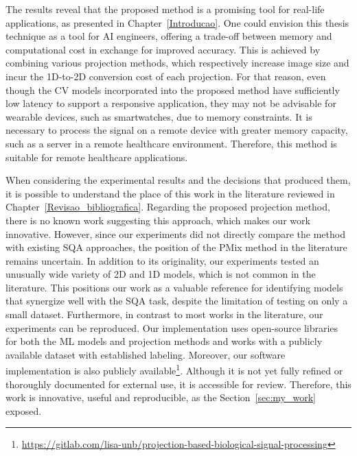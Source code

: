 The results reveal that the proposed method is a promising tool for real-life applications, as presented in Chapter~\ref{Introducao}.
One could envision this thesis technique as a tool for \gls{AI} engineers, offering a trade-off between memory and computational cost in exchange for improved accuracy. This is achieved by combining various projection methods, which respectively increase image size and incur the 1D-to-2D conversion cost of each projection.
For that reason, even though the \gls{CV} models incorporated into the proposed method have sufficiently low latency to support a responsive application, they may not be advisable for wearable devices, such as smartwatches, due to memory constraints.
It is necessary to process the signal on a remote device with greater memory capacity, such as a server in a remote healthcare environment.
Therefore, this method is suitable for remote healthcare applications.


When considering the experimental results and the decisions that produced them, it is possible to understand the place of this work in the literature reviewed in Chapter~\ref{Revisao_bibliografica}.
Regarding the proposed projection method, there is no known work suggesting this approach, which makes our work innovative. However, since our experiments did not directly compare the method with existing \gls{SQA} approaches, the position of the \gls{PMix} method in the literature remains uncertain.
In addition to its originality, our experiments tested an unusually wide variety of 2D and 1D models, which is not common in the literature. This positions our work as a valuable reference for identifying models that synergize well with the \gls{SQA} task, despite the limitation of testing on only a small dataset.
Furthermore, in contrast to most works in the literature, our experiments can be reproduced. Our implementation uses open-source libraries for both the \gls{ML} models and projection methods and works with a publicly available dataset with established labeling. Moreover, our software implementation is also publicly available\footnote{\url{https://gitlab.com/lisa-unb/projection-based-biological-signal-processing}}. Although it is not yet fully refined or thoroughly documented for external use, it is accessible for review.
Therefore, this work is innovative, useful and reproducible, as the Section~\ref{sec:my_work} exposed.

